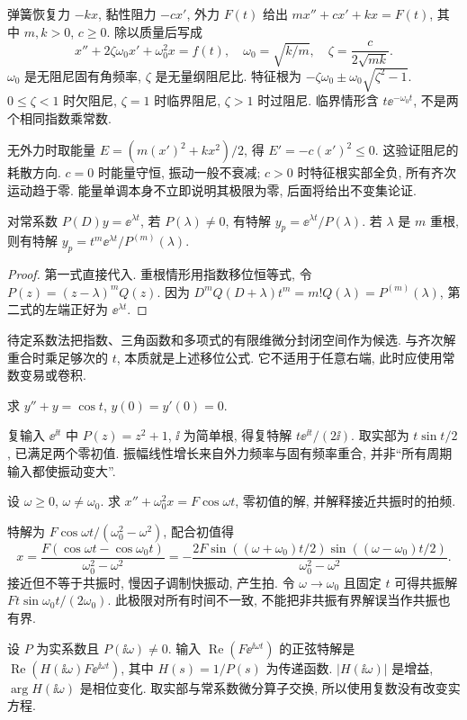 弹簧恢复力 $-kx$, 黏性阻力 $-cx'$, 外力 $F(t)$ 给出 $mx''+cx'+kx=F(t)$, 其中 $m,k>0$, $c\ge0$. 除以质量后写成
\begin{equation}\label{eq:oscillator}
x''+2\zeta\omega_0x'+\omega_0^2x=f(t),\quad
 \omega_0=\sqrt{k/m},\quad \zeta=\frac{c}{2\sqrt{mk}}.
\end{equation}
$\omega_0$ 是无阻尼固有角频率, $\zeta$ 是无量纲阻尼比. 特征根为 $-\zeta\omega_0\pm\omega_0\sqrt{\zeta^2-1}$. $0\le\zeta<1$ 时欠阻尼, $\zeta=1$ 时临界阻尼, $\zeta>1$ 时过阻尼. 临界情形含 $t\ee^{-\omega_0t}$, 不是两个相同指数乘常数.

无外力时取能量 $E=(m(x')^2+kx^2)/2$, 得 $E'=-c(x')^2\le0$. 这验证阻尼的耗散方向. $c=0$ 时能量守恒, 振动一般不衰减; $c>0$ 时特征根实部全负, 所有齐次运动趋于零. 能量单调本身不立即说明其极限为零, 后面将给出不变集论证.
\begin{proposition}[指数响应]
对常系数 $P(D)y=\ee^{\lambda t}$, 若 $P(\lambda)\ne0$, 有特解 $y_p=\ee^{\lambda t}/P(\lambda)$. 若 $\lambda$ 是 $m$ 重根, 则有特解 $y_p=t^m\ee^{\lambda t}/P^{(m)}(\lambda)$.
\end{proposition}
\begin{proof}
第一式直接代入. 重根情形用指数移位恒等式, 令 $P(z)=(z-\lambda)^mQ(z)$. 因为 $D^mQ(D+\lambda)t^m=m!Q(\lambda)=P^{(m)}(\lambda)$, 第二式的左端正好为 $\ee^{\lambda t}$.
\end{proof}
待定系数法把指数、三角函数和多项式的有限维微分封闭空间作为候选. 与齐次解重合时乘足够次的 $t$, 本质就是上述移位公式. 它不适用于任意右端, 此时应使用常数变易或卷积.
\begin{example}求 $y''+y=\cos t$, $y(0)=y'(0)=0$.\end{example}
\begin{solution}
复输入 $\ee^{\ii t}$ 中 $P(z)=z^2+1$, $\ii$ 为简单根, 得复特解 $t\ee^{\ii t}/(2\ii)$. 取实部为 $t\sin t/2$, 已满足两个零初值. 振幅线性增长来自外力频率与固有频率重合, 并非“所有周期输入都使振动变大”.
\end{solution}
\begin{example}设 $\omega\ge0$, $\omega\ne\omega_0$. 求 $x''+\omega_0^2x=F\cos\omega t$, 零初值的解, 并解释接近共振时的拍频.\end{example}
\begin{solution}
特解为 $F\cos\omega t/(\omega_0^2-\omega^2)$, 配合初值得
\[
x=\frac{F(\cos\omega t-\cos\omega_0t)}{\omega_0^2-\omega^2}
=-\frac{2F\sin((\omega+\omega_0)t/2)\sin((\omega-\omega_0)t/2)}{\omega_0^2-\omega^2}.
\]
接近但不等于共振时, 慢因子调制快振动, 产生拍. 令 $\omega\to\omega_0$ 且固定 $t$ 可得共振解 $Ft\sin\omega_0t/(2\omega_0)$. 此极限对所有时间不一致, 不能把非共振有界解误当作共振也有界.
\end{solution}
设 $P$ 为实系数且 $P(\ii\omega)\ne0$. 输入 $\operatorname{Re}(F\ee^{\ii\omega t})$ 的正弦特解是 $\operatorname{Re}(H(\ii\omega)F\ee^{\ii\omega t})$, 其中 $H(s)=1/P(s)$ 为传递函数. $|H(\ii\omega)|$ 是增益, $\arg H(\ii\omega)$ 是相位变化. 取实部与常系数微分算子交换, 所以使用复数没有改变实方程.

